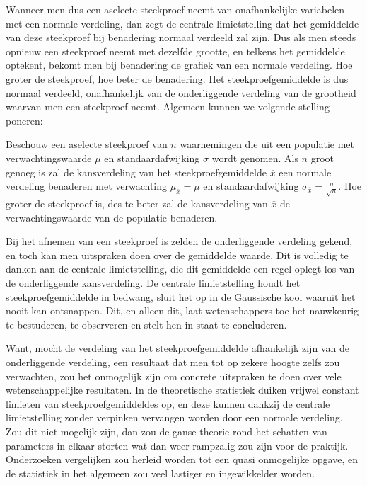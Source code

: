 {Wanneer men dus een aselecte steekproef neemt van onafhankelijke variabelen met een normale verdeling, dan zegt de centrale limietstelling dat het gemiddelde van deze steekproef bij benadering normaal verdeeld zal zijn. Dus als men steeds opnieuw een steekproef neemt met dezelfde grootte, en telkens het gemiddelde optekent, bekomt men bij benadering de grafiek van een normale verdeling. Hoe groter de steekproef, hoe beter de benadering. Het steekproefgemiddelde is dus normaal verdeeld, onafhankelijk van de onderliggende verdeling van de grootheid waarvan men een steekproef neemt. Algemeen kunnen we volgende stelling poneren:

\begin{definition}
Beschouw een aselecte steekproef van $n$ waarnemingen die uit een populatie met verwachtingswaarde $\mu$ en standaardafwijking $\sigma$ wordt genomen. Als $n$ groot genoeg is zal de kansverdeling van het steekproefgemiddelde $\overline{x}$ een normale verdeling benaderen met verwachting $\mu_{\overline{x}} = \mu$ en standaardafwijking $\sigma_{\overline{x}} = \frac{\sigma}{\sqrt{n}}$. Hoe groter de steekproef is, des te beter zal de kansverdeling van $\overline{x}$ de verwachtingswaarde van de populatie benaderen.

\end{definition}

Bij het afnemen van een steekproef is zelden de onderliggende verdeling gekend, en toch kan men uitspraken doen over de gemiddelde waarde. Dit is volledig te danken aan de centrale limietstelling, die dit gemiddelde een regel oplegt los van de onderliggende kansverdeling. De centrale limietstelling houdt het steekproefgemiddelde in bedwang, sluit het op in de Gaussische kooi waaruit het nooit kan ontsnappen. Dit, en alleen dit, laat wetenschappers toe het nauwkeurig te bestuderen, te observeren en stelt hen in staat te concluderen.

Want, mocht de verdeling van het steekproefgemiddelde afhankelijk zijn van de onderliggende verdeling, een resultaat dat men tot op zekere hoogte zelfs zou verwachten, zou het onmogelijk zijn om concrete uitspraken te doen over vele wetenschappelijke resultaten. In de theoretische statistiek duiken vrijwel constant limieten van steekproefgemiddeldes op, en deze kunnen dankzij de centrale limietstelling zonder verpinken vervangen worden door een normale verdeling. Zou dit niet mogelijk zijn, dan zou de ganse theorie rond het schatten van parameters in elkaar storten wat dan weer rampzalig zou zijn voor de praktijk. Onderzoeken vergelijken zou herleid worden tot een quasi onmogelijke opgave, en de statistiek in het algemeen zou veel lastiger en ingewikkelder worden.

}
